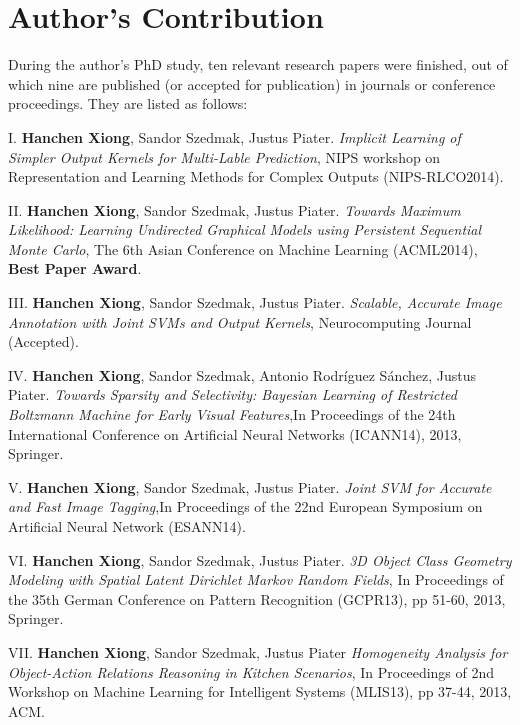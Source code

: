 \section{Author's Contribution}
\label{sec:contribution}
During the author's  PhD study, ten relevant research papers were finished, out of which nine are published (or accepted for publication) in 
journals or conference proceedings. They are listed as follows:     
\begin{shaded}
{\Huge I.} \textbf{Hanchen Xiong}, Sandor Szedmak, Justus Piater. {\it Implicit Learning of Simpler Output Kernels for Multi-Lable Prediction}, NIPS workshop on Representation and Learning Methods for Complex Outputs (NIPS-RLCO2014).  
\vspace{-.2cm}

{\Huge II.} \textbf{Hanchen Xiong}, Sandor Szedmak, Justus Piater. {\it Towards Maximum Likelihood: Learning Undirected Graphical Models using Persistent Sequential Monte Carlo}, The 6th Asian Conference on Machine Learning (ACML2014), 
\textbf{Best Paper Award}.    
\vspace{-.2cm}

{\Huge III.} \textbf{Hanchen Xiong}, Sandor Szedmak, Justus Piater. {\it Scalable, Accurate Image Annotation with Joint SVMs and Output Kernels}, Neurocomputing Journal (Accepted).  
\vspace{-.2cm}

{\Huge IV.} \textbf{Hanchen Xiong}, Sandor Szedmak, Antonio Rodr{\'i}guez S{\'a}nchez, Justus Piater. {\it Towards Sparsity and Selectivity: Bayesian Learning of Restricted Boltzmann Machine for Early Visual Features},In Proceedings of the 24th International Conference on Artificial Neural Networks (ICANN14), 2013, Springer. 
\vspace{-.2cm}

{\Huge V.} \textbf{Hanchen Xiong}, Sandor Szedmak, Justus Piater. {\it Joint SVM for Accurate and Fast Image Tagging},In Proceedings of the 22nd European Symposium on Artificial Neural Network (ESANN14). 
\vspace{-.2cm}


{\Huge VI.} \textbf{Hanchen Xiong}, Sandor Szedmak, Justus Piater. {\it 3D Object Class Geometry Modeling with Spatial Latent Dirichlet Markov Random Fields}, In Proceedings of the 35th German Conference on Pattern Recognition (GCPR13), pp 51-60, 2013,  Springer.  
\vspace{-.2cm}

{\Huge VII.} \textbf{Hanchen Xiong}, Sandor Szedmak, Justus Piater {\it Homogeneity Analysis for Object-Action Relations Reasoning in Kitchen Scenarios}, 
In Proceedings of 2nd Workshop on Machine Learning for Intelligent Systems (MLIS13), pp 37-44,  2013, ACM. 
\vspace{-.2cm}


\end{shaded}
